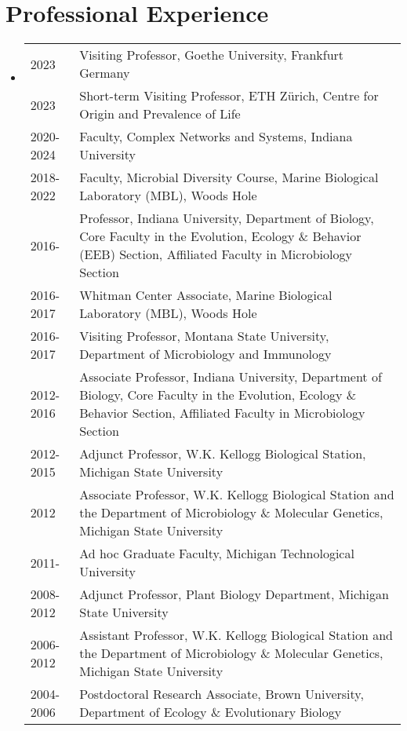 \documentclass[11pt]{article}
\begin{document}
\section*{Professional Experience}
\begin{itemize}[left=0pt,label={}]
  \item \begin{tabular}{@{}p{2cm} p{13cm}}
    2023 & Visiting Professor, Goethe University, Frankfurt Germany \\
    2023 & Short-term Visiting Professor, ETH Zürich, Centre for Origin and Prevalence of Life \\
    2020-2024 & Faculty, Complex Networks and Systems, Indiana University \\
    2018-2022 & Faculty, Microbial Diversity Course, Marine Biological Laboratory (MBL), Woods Hole \\
    2016- & Professor, Indiana University, Department of Biology, Core Faculty in the Evolution, Ecology \& Behavior (EEB) Section, Affiliated Faculty in Microbiology Section \\
    2016-2017 & Whitman Center Associate, Marine Biological Laboratory (MBL), Woods Hole \\
    2016-2017 & Visiting Professor, Montana State University, Department of Microbiology and Immunology \\
    2012-2016 & Associate Professor, Indiana University, Department of Biology, Core Faculty in the Evolution, Ecology \& Behavior Section, Affiliated Faculty in Microbiology Section \\
    2012-2015 & Adjunct Professor, W.K. Kellogg Biological Station, Michigan State University \\
    2012 & Associate Professor, W.K. Kellogg Biological Station and the Department of Microbiology \& Molecular Genetics, Michigan State University \\
    2011- & Ad hoc Graduate Faculty, Michigan Technological University \\
    2008-2012 & Adjunct Professor, Plant Biology Department, Michigan State University \\
    2006-2012 & Assistant Professor, W.K. Kellogg Biological Station and the Department of Microbiology \& Molecular Genetics, Michigan State University \\
    2004-2006 & Postdoctoral Research Associate, Brown University, Department of Ecology \& Evolutionary Biology \\
  \end{tabular}
\end{itemize}
\end{document}
